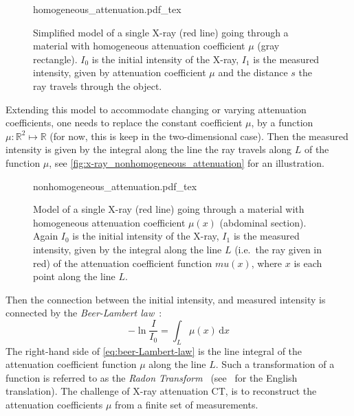 \begin{figure}[t]
	\centering
	\def\svgwidth{0.75\textwidth}
	{homogeneous_attenuation.pdf_tex}
	\caption{Simplified model of a single X-ray (red line) going through a material with
		homogeneous attenuation coefficient \(\mu\) (gray rectangle). \(I_0\) is the initial
		intensity of the X-ray, \(I_1\) is the measured intensity, given by attenuation
		coefficient \(\mu\) and the distance \(s\) the ray travels through the
		object.}\label{fig:x-ray_homogeneous_attenuation}
\end{figure}

Extending this model to accommodate changing or varying attenuation coefficients, one needs to
replace the constant coefficient \(\mu\), by a function \(\mu: \mathbb{R}^2 \mapsto \mathbb{R}\)
(for now, this is keep in the two-dimensional case). Then the measured intensity is given by the
integral along the line the ray travels along \(L\) of the function \(\mu\), see
\autoref{fig:x-ray_nonhomogeneous_attenuation} for an illustration.

\begin{figure}[t]
	\centering
	\def\svgwidth{0.75\textwidth}
	{nonhomogeneous_attenuation.pdf_tex}
	\caption{Model of a single X-ray (red line) going through a material with
		homogeneous attenuation coefficient \(\mu(x)\) (abdominal section). Again \(I_0\) is
		the initial intensity of the X-ray, \(I_1\) is the measured intensity, given
		by the integral along the line \(L\) (i.e.\ the ray given in red) of the
		attenuation coefficient function \(mu(x)\), where \(x\) is each point along the
		line \(L\).}\label{fig:x-ray_nonhomogeneous_attenuation}
\end{figure}

Then the connection between the initial intensity, and measured intensity is connected by the
\textit{Beer-Lambert law}~\cite{buzug_computed_2008}:
\begin{equation}\label{eq:beer-Lambert-law}
	- \ln \frac{I}{I_0} = \int_L \mu (x) \, \mathrm{d}x
\end{equation}
The right-hand side of \autoref{eq:beer-Lambert-law} is the line integral of the attenuation
coefficient function \(\mu\) along the line \(L\). Such a transformation of a function is referred
to as the \textit{Radon Transform}~\cite{radon_uber_1917} (see~\cite{radon_determination_1986} for
the English translation). The challenge of X-ray attenuation CT, is to reconstruct the attenuation
coefficients \(\mu\) from a finite set of measurements.

